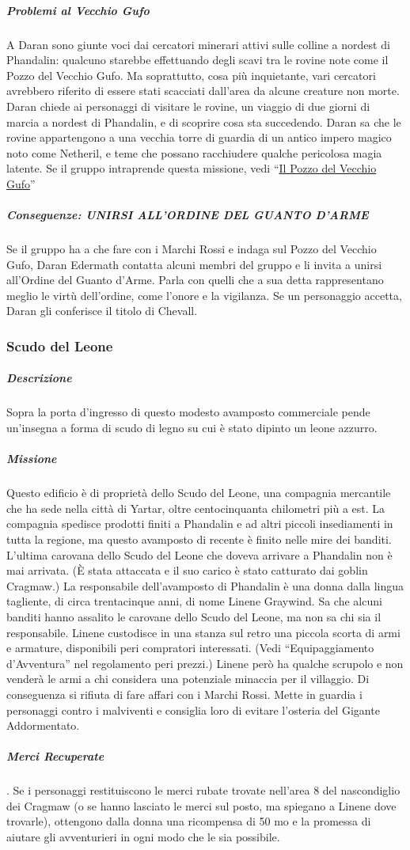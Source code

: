 \documentclass{article}
\begin{document}
\subparagraph{Problemi al Vecchio Gufo}
 A Daran sono giunte
voci dai cercatori minerari attivi sulle colline a nordest di
Phandalin: qualcuno starebbe effettuando degli scavi tra le
rovine note come il Pozzo del Vecchio Gufo. Ma soprattutto,
cosa più inquietante, vari cercatori avrebbero riferito di
essere stati scacciati dall'area da alcune creature non morte.
Daran chiede ai personaggi di visitare le rovine, un viaggio
di due giorni di marcia a nordest di Phandalin, e di scoprire
cosa sta succedendo. Daran sa che le rovine appartengono
a una vecchia torre di guardia di un antico impero magico
noto come Netheril, e teme che possano racchiudere qualche
pericolosa magia latente. Se il gruppo intraprende questa
missione, vedi “\hyperlink{gufo}{Il Pozzo del Vecchio Gufo}”

\subparagraph{Conseguenze: UNIRSI ALL'ORDINE DEL GUANTO D'ARME }
Se il gruppo ha a che fare con i Marchi Rossi e indaga sul
Pozzo del Vecchio Gufo, Daran Edermath contatta alcuni
membri del gruppo e li invita a unirsi all'Ordine del Guanto
d’Arme. Parla con quelli che a sua detta rappresentano
meglio le virtù dell'ordine, come l'onore e la vigilanza. Se un
personaggio accetta, Daran gli conferisce il titolo di Chevall.  

\subsubsection{Scudo del Leone}
\subparagraph{Descrizione}
Sopra la porta d’ingresso di questo modesto avamposto
commerciale pende un'insegna a forma di scudo di legno su
cui è stato dipinto un leone azzurro.
\subparagraph{Missione}
Questo edificio è di proprietà dello Scudo del Leone, una
compagnia mercantile che ha sede nella città di Yartar, oltre
centocinquanta chilometri più a est. La compagnia spedisce
prodotti finiti a Phandalin e ad altri piccoli insediamenti in
tutta la regione, ma questo avamposto di recente è finito nelle
mire dei banditi. L'ultima carovana dello Scudo del Leone
che doveva arrivare a Phandalin non è mai arrivata. (È stata
attaccata e il suo carico è stato catturato dai goblin Cragmaw.)
La responsabile dell’avamposto di Phandalin è una donna
dalla lingua tagliente, di circa trentacinque anni, di nome
Linene Graywind. Sa che alcuni banditi hanno assalito
le carovane dello Scudo del Leone, ma non sa chi sia il
responsabile.
Linene custodisce in una stanza sul retro una piccola
scorta di armi e armature, disponibili peri compratori
interessati. (Vedi “Equipaggiamento d’Avventura” nel
regolamento peri prezzi.) Linene però ha qualche scrupolo e
non venderà le armi a chi considera una potenziale minaccia
per il villaggio. Di conseguenza si rifiuta di fare affari con
i Marchi Rossi. Mette in guardia i personaggi contro i
malviventi e consiglia loro di evitare l’osteria del Gigante
Addormentato.
\subparagraph{Merci Recuperate}. Se i personaggi restituiscono le merci
rubate trovate nell’area 8 del nascondiglio dei Cragmaw (o se
hanno lasciato le merci sul posto, ma spiegano a Linene dove
trovarle), ottengono dalla donna una ricompensa di 50 mo e
la promessa di aiutare gli avventurieri in ogni modo che le
sia possibile.
\end{document}
